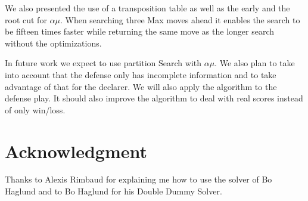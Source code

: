 \documentclass{ecai}
\begin{document}
We also presented the use of a transposition table as well as the
early and the root cut for $\alpha\mu$. When searching three Max moves
ahead it enables the search to be fifteen times faster while returning
the same move as the longer search without the optimizations.


In future work we expect to use partition Search with $\alpha\mu$. We
also plan to take into account that the defense only has incomplete
information and to take advantage of that for the declarer. We will
also apply the algorithm to the defense play. It should also improve
the algorithm to deal with real scores instead of only win/loss.

\section*{Acknowledgment}

Thanks to Alexis Rimbaud for explaining me how to use the solver of Bo
Haglund and to Bo Haglund for his Double Dummy Solver.

%


\end{document}
